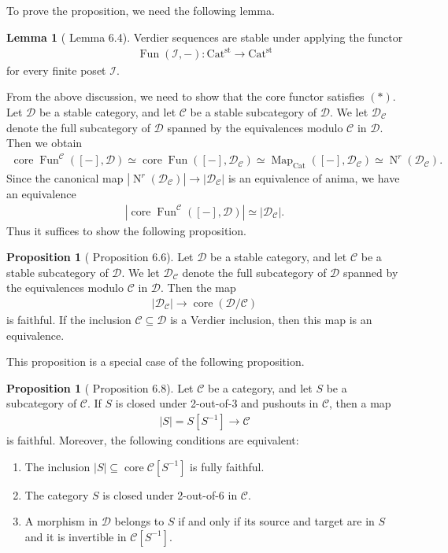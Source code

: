 \documentclass[a4paper,dvipdfmx,11pt,reqno]{amsart}
\DeclareMathOperator{\Map}{Map}
\DeclareMathOperator{\N}{N}
\DeclareMathOperator{\Fun}{Fun}
\newcommand{\C}{\mathcal{C}}
\newcommand{\D}{\mathcal{D}}
\newcommand{\I}{\mathcal{I}}
\DeclareMathOperator{\core}{core}
\newcommand{\Cat}{\mathrm{Cat}}
\newcommand{\Catst}{\mathrm{Cat^{st}}}
\theoremstyle{definition}
\newtheorem{lemma}[theorem]{Lemma}
\newtheorem{proposition}[theorem]{Proposition}
\begin{document}
To prove the proposition, we need the following lemma.

\begin{lemma}[\cite{HLS23} Lemma 6.4] \label{HLS23.lem.6.4} 
  Verdier sequences are stable under applying the functor 
  \begin{align*}
    \Fun(\I,-) : \Catst \to \Catst
  \end{align*}
  for every finite poset $\I$.
\end{lemma}

From the above discussion, we need to show that the core functor satisfies $(\ast)$.
Let $\D$ be a stable category, and let $\C$ be a stable subcategory of $\D$.
We let $\D_{\C}$ denote the full subcategory of $\D$ spanned by the equivalences modulo $\C$ in $\D$.
Then we obtain 
\begin{align*}
  \core\Fun^{\C}([-],\D) 
  \simeq \core\Fun([-],\D_{\C})
  \simeq \Map_{\Cat}([-],\D_{\C})
  \simeq \N^r(\D_{\C}).
\end{align*}
Since the canonical map $|\N^r(\D_{\C})| \to |\D_{\C}|$ is an equivalence of anima, we have an equivalence 
\begin{align*}
  |\core\Fun^{\C}([-],\D)| \simeq |\D_{\C}|.
\end{align*}
Thus it suffices to show the following proposition.

\begin{proposition}[\cite{HLS23} Proposition 6.6] \label{HLS23.prop.6.6} 
  Let $\D$ be a stable category, and let $\C$ be a stable subcategory of $\D$.
  We let $\D_{\C}$ denote the full subcategory of $\D$ spanned by the equivalences modulo $\C$ in $\D$.
  Then the map 
  \begin{align*}
    |\D_{\C}| \to \core(\D/\C)
  \end{align*}
  is faithful.
  If the inclusion $\C \subseteq \D$ is a Verdier inclusion, then this map is an equivalence.
\end{proposition}

This proposition is a special case of the following proposition.

\begin{proposition}[\cite{HLS23} Proposition 6.8] \label{HLS23.prop.6.8} 
  Let $\C$ be a category, and let $S$ be a subcategory of $\C$.
  If $S$ is closed under 2-out-of-3 and pushouts in $\C$, then a map 
  \begin{align*}
    |S| = S[S^{-1}] \to \C
  \end{align*}
  is faithful. 
  Moreover, the following conditions are equivalent:
  \begin{enumerate}
    \item The inclusion $|S| \subseteq \core\C[S^{-1}]$ is fully faithful.
    \item The category $S$ is closed under 2-out-of-6 in $\C$.
    \item A morphism in $\D$ belongs to $S$ if and only if its source and target are in $S$ and it is invertible in $\C[S^{-1}]$.
  \end{enumerate}
\end{proposition}
\end{document}

